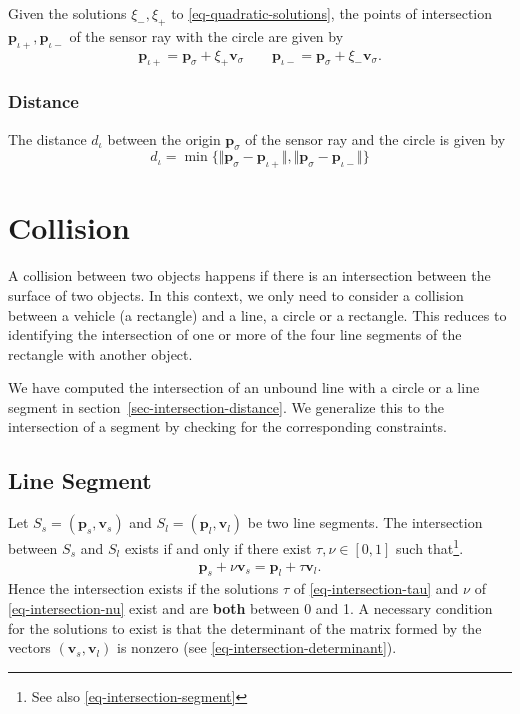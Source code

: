 \documentclass[11pt]{article}
\newcommand{\diota}{d_\iota}
\newcommand{\pbl}{\mathbf{p}_l}
\newcommand{\pbs}{\mathbf{p}_s}
\newcommand{\pbiotp}{\mathbf{p}_{\iota+}}
\newcommand{\pbiotm}{\mathbf{p}_{\iota-}}
\newcommand{\pbsig}{\mathbf{p}_\sigma}
\newcommand{\vbl}{\mathbf{v}_l}
\newcommand{\vbs}{\mathbf{v}_s}
\newcommand{\vbsig}{\mathbf{v}_\sigma}
\begin{document}
Given the solutions $\xi_-,\xi_+$ to \eqref{eq-quadratic-solutions}, the points
of intersection  $\pbiotp,\pbiotm$ of the sensor ray with the circle are given
by
\begin{equation}
    \pbiotp=\pbsig + \xi_+\vbsig\qquad\pbiotm=\pbsig + \xi_-\vbsig.
\end{equation}

\subsubsection*{Distance}

The distance $\diota$ between the origin $\pbsig$ of the sensor ray and the
circle is given by
\begin{equation}
    \diota = \min\{\Vert\pbsig-\pbiotp\Vert,\Vert\pbsig-\pbiotm\Vert\}
    \label{eq-distance-circle}
\end{equation}


\section{Collision}
\label{sec-collision}

A collision between two objects happens if there is an intersection between the
surface of two objects. In this context, we only need
to consider a collision between a vehicle (a rectangle) and a line, a circle
or a rectangle. This reduces to identifying the intersection of one or more
of the four line segments of the rectangle with another object.

We have computed the intersection of an unbound line with a circle or a
line segment in section~\ref{sec-intersection-distance}. We generalize this to
the intersection of a segment by checking for the corresponding constraints.

\subsection{Line Segment}
\label{sec-collision-line-segment}

Let $S_s=(\pbs,\vbs)$ and $S_l=(\pbl,\vbl)$ be two line segments. The
intersection between $S_s$ and $S_l$ exists if and only if there exist
$\tau,\nu\in[0,1]$ such that\footnote{See also
\eqref{eq-intersection-segment}}.
\begin{eqnarray}
    \pbs + \nu \vbs = \pbl + \tau \vbl. \label{eq-collision-segment}
\end{eqnarray}
Hence the intersection exists if the solutions
$\tau$ of \eqref{eq-intersection-tau} and $\nu$ of \eqref{eq-intersection-nu}
exist and are \textbf{both} between 0 and 1. A necessary condition for the
solutions to exist is that the determinant of the matrix formed by the vectors
$(\vbs,\vbl)$ is nonzero (see \eqref{eq-intersection-determinant}).
\end{document}
